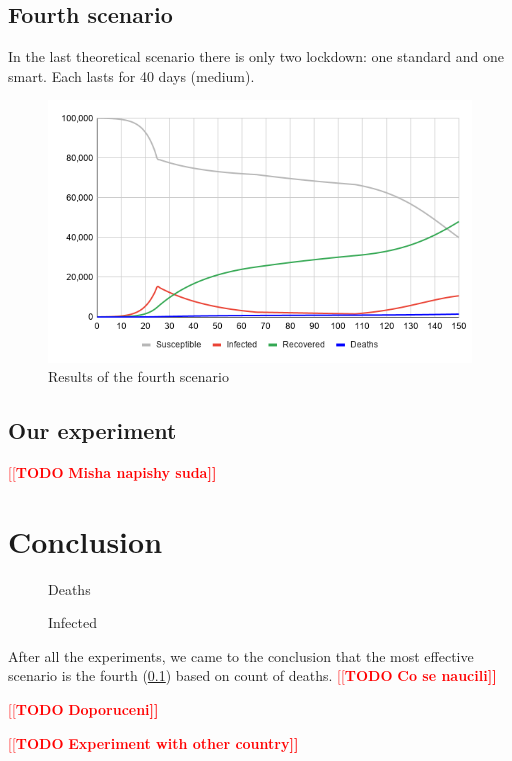 \documentclass[12pt,a4paper,english]{article}
\newcommand{\todo}[1]{\textcolor{red}{[[\textbf{TODO} \textbf{#1]]}}}
\begin{document}
    \subsection{Fourth scenario}
    \label{fourth_scenario}
    In the last theoretical scenario there is only two lockdown: one standard and one smart.
    Each lasts for 40 days (medium).
    \begin{figure}[h!]
        \centering
        \includegraphics[scale=0.55]{med+smart.png}
        \caption{Results of the fourth scenario}
    \end{figure}

    \subsection{Our experiment}
    \todo{Misha napishy suda}

    \section{Conclusion} 
    \begin{figure}[h!]
        \centering
        \hfill
        \caption{Deaths}
    \end{figure}

    \begin{figure}[h!]
        \centering
        \hfill
        \caption{Infected}
    \end{figure}
    After all the experiments, we came to the conclusion that the most effective  scenario is the fourth (\ref{fourth_scenario}) based on count of deaths.
    \todo{Co se naucili}
    
    \todo{Doporuceni}

    \todo{Experiment with other country}

    \clearpage
	
	
\end{document}
